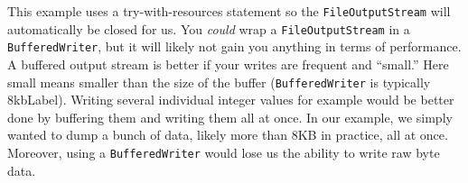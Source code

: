 This example uses a try-with-resources statement
so the \texttt{FileOutputStream} will automatically
be closed for us. You \emph{could} wrap a \texttt{FileOutputStream} 
in a \texttt{BufferedWriter}, but it
will likely not gain you anything in terms of performance.  A
buffered output stream is better if your writes are 
frequent and ``small.'' Here small means smaller than
the size of the buffer (\texttt{BufferedWriter}
is typically 8\gls{kbLabel}).  Writing several individual
integer values for example would be better done by buffering
them and writing them all at once.  
In our example, we simply wanted to dump a bunch of data, 
likely more than 8KB in practice, all at once.  Moreover, 
using a \texttt{BufferedWriter} would lose us the
ability to write raw byte data.


